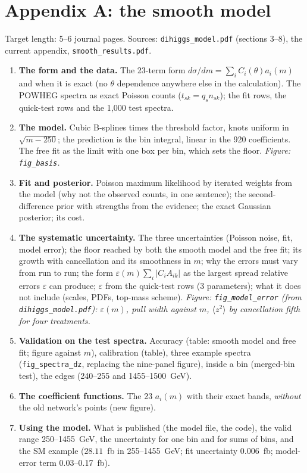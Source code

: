 \documentclass[11pt]{article}
\newcommand{\file}[1]{\nolinkurl{#1}}
\begin{document}
\section{Appendix A: the smooth model}
\label{sec:A}

Target length: 5--6 journal pages. Sources: \file{dihiggs_model.pdf} (sections 3--8), the current
appendix, \file{smooth_results.pdf}.

\begin{enumerate}[label=\textbf{A.\arabic*}]
  \item \textbf{The form and the data.} The 23-term form $d\sigma/dm = \sum_i C_i(\theta)a_i(m)$ and when it
    is exact (no $\theta$ dependence anywhere else in the calculation). The POWHEG spectra as exact Poisson
    counts ($t_{sk} = q_s n_{sk}$); the fit rows, the quick-test rows and the 1,000 test spectra.
  \item \textbf{The model.} Cubic B-splines times the threshold factor, knots uniform in $\sqrt{m-250}$;
    the prediction is the bin integral, linear in the 920 coefficients. The free fit as the limit with
    one box per bin, which sets the floor. \emph{Figure: \file{fig_basis}.}
  \item \textbf{Fit and posterior.} Poisson maximum likelihood by iterated weights from the model (why not
    the observed counts, in one sentence); the second-difference prior with strengths from the evidence;
    the exact Gaussian posterior; its cost.
  \item \textbf{The systematic uncertainty.} The three uncertainties (Poisson noise, fit, model error); the
    floor reached by both the smooth model and the free fit; its growth with cancellation and its smoothness
    in $m$; why the errors must vary from run to run; the form $\varepsilon(m)\sum_i|C_iA_{ik}|$ as the
    largest spread relative errors $\varepsilon$ can produce; $\varepsilon$ from the quick-test rows (3
    parameters); what it does not include (scales, PDFs, top-mass scheme). \emph{Figure:
    \file{fig_model_error} (from \file{dihiggs_model.pdf}): $\varepsilon(m)$, pull width against $m$,
    $\langle z^2\rangle$ by cancellation fifth for four treatments.}
  \item \textbf{Validation on the test spectra.} Accuracy (table: smooth model and free fit;
    figure against $m$), calibration (table), three example spectra (\file{fig_spectra_dz}, replacing the
    nine-panel figure), inside a bin (merged-bin test), the edges (240--255 and 1455--1500~GeV).
  \item \textbf{The coefficient functions.} The 23 $a_i(m)$ with their exact bands, \emph{without} the old
    network's points (new figure).
  \item \textbf{Using the model.} What is published (the model file, the code), the valid range
    250--1455~GeV, the uncertainty for one bin and for sums of bins, and the SM example
    ($28.11$~fb in 255--1455~GeV; fit uncertainty 0.006~fb; model-error term 0.03--0.17~fb).
\end{enumerate}
\end{document}
